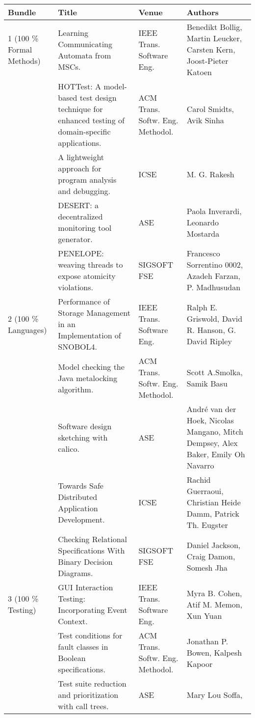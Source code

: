 \begin{center}
\begin{longtable}{|p{}p{}p{}p{}|}
    \hline
    Bundle & Title & Venue & Authors \\
    \hline
    \rowcolor{black!20} 1 (100 \% Formal Methods) & Learning Communicating Automata from MSCs.& 
IEEE Trans. 
Software Eng.& Benedikt Bollig, Martin Leucker, Carsten Kern, Joost-Pieter Katoen \\
 & HOTTest: A model-based test design technique for enhanced testing of domain-specific 
applications.& ACM Trans. Softw. Eng. Methodol.& Carol Smidts, Avik Sinha \\
\rowcolor{black!20} & A lightweight approach for program analysis and debugging.& ICSE& M. G. Rakesh 
\\
 & DESERT: a decentralized monitoring tool generator.& ASE& Paola Inverardi, Leonardo Mostarda \\
\rowcolor{black!20} & PENELOPE: weaving threads to expose atomicity violations.& SIGSOFT FSE& 
Francesco Sorrentino 0002, Azadeh Farzan, P. Madhusudan \\
2 (100 \% Languages) & Performance of Storage Management in an Implementation of SNOBOL4.& IEEE 
Trans. 
Software Eng.& Ralph E. Griswold, David R. Hanson, G. David Ripley \\
\rowcolor{black!20} & Model checking the Java metalocking algorithm.& ACM Trans. Softw. Eng. 
Methodol.& Scott A.Smolka, Samik Basu \\
 & Software design sketching with calico.& ASE& André van der Hoek, Nicolas Mangano, Mitch Dempsey, 
Alex Baker, Emily Oh Navarro \\
\rowcolor{black!20} & Towards Safe Distributed Application Development.& ICSE& Rachid Guerraoui, 
Christian Heide Damm, Patrick Th. Eugster \\
 & Checking Relational Specifications With Binary Decision Diagrams.& SIGSOFT FSE& Daniel Jackson, 
Craig Damon, Somesh Jha \\
\rowcolor{black!20} 3 (100 \% Testing) & GUI Interaction Testing: Incorporating Event Context.& 
IEEE 
Trans. Software Eng.& Myra B. Cohen, Atif M. Memon, Xun Yuan \\
 & Test conditions for fault classes in Boolean specifications.& ACM Trans. Softw. Eng. Methodol.& 
Jonathan P. Bowen, Kalpesh Kapoor \\
\rowcolor{black!20} & Test suite reduction and prioritization with call trees.& ASE& Mary Lou Soffa, 

\end{longtable}
\end{center}
